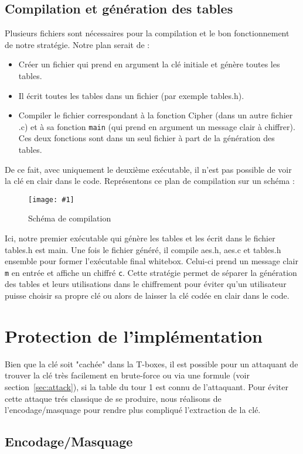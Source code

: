 \documentclass[a4paper, 10pt]{article}
\newcommand{\imagewidth}{0.9\textwidth}
\newcommand{\displayimage}[2]{
  \begin{figure}[H]
    \centering
    \texttt{[image: \#1]}
    \caption{#2}
  \end{figure}
}
\begin{document}
\subsection{Compilation et génération des tables}
\normalsize
Plusieurs fichiers sont nécessaires pour la compilation et le bon fonctionnement de notre stratégie. 
Notre plan serait de :
\begin{itemize}
  \item Créer un fichier qui prend en argument la clé initiale et génère toutes les tables.
  \item Il écrit toutes les tables dans un fichier (par exemple tables.h).
  \item Compiler le fichier correspondant à la fonction Cipher (dans un autre fichier .c) et à sa fonction \texttt{main} (qui prend en argument un message clair à chiffrer).
  Ces deux fonctions sont dans un seul fichier à part de la génération des tables.
\end{itemize}
De ce fait, avec uniquement le deuxième exécutable, il n'est pas possible de voir la clé en clair dans le code.
Représentons ce plan de compilation sur un schéma :
\displayimage{images/Schéma_compilation.jpg}{Schéma de compilation}
Ici, notre premier exécutable qui génère les tables et les écrit dans le fichier tables.h est main. Une fois 
le fichier généré, il compile aes.h, aes.c et tables.h ensemble pour former l'exécutable final whitebox. Celui-ci 
prend un message clair \texttt{m} en entrée et affiche un chiffré \texttt{c}. Cette stratégie permet de séparer la génération des tables 
et leurs utilisations dans le chiffrement pour éviter qu'un utilisateur puisse choisir sa propre clé ou alors de laisser la clé codée en 
clair dans le code.
\section{Protection de l'implémentation}
\label{sec:protection}
Bien que la clé soit "cachée" dans la T-boxes, il est possible pour un attaquant de trouver la clé très facilement 
en brute-force ou via une formule (voir section~\ref{sec:attack}), si la table du tour 1 est connu de l'attaquant. 
Pour éviter cette attaque trés classique de se produire, nous 
réalisons de l'encodage/masquage pour rendre plus compliqué l'extraction de la clé.
\subsection{Encodage/Masquage}
\normalsize
\end{document}
